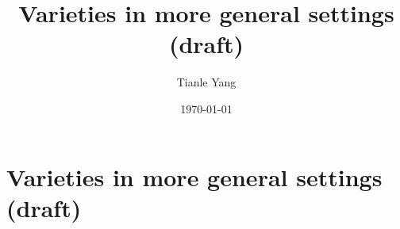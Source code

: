 \documentclass{noteformyself}
\title{Varieties in more general settings (draft)}
\author{Tianle Yang}
\date{\today}
\begin{document}
    \maketitle

    \section{Varieties in more general settings (draft)}


\end{document}
